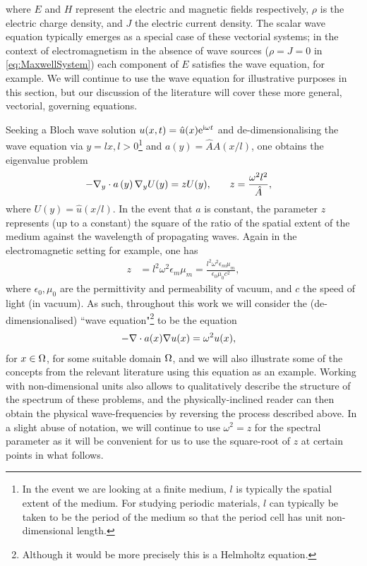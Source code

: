 where $E$ and $H$ represent the electric and magnetic fields respectively, $\rho$ is the electric charge density, and $J$ the electric current density. 
The scalar wave equation typically emerges as a special case of these vectorial systems; in the context of electromagnetism in the absence of wave sources ($\rho=J=0$ in \eqref{eq:MaxwellSystem}) each component of $E$ satisfies the wave equation, for example.
We will continue to use the wave equation for illustrative purposes in this section, but our discussion of the literature will cover these more general, vectorial, governing equations.

Seeking a Bloch wave solution $u(x,t) = \hat{u}(x)\mathrm{e}^{\mathrm{i}\omega t}$ and de-dimensionalising the wave equation via $y=lx, l>0$\footnote{In the event we are looking at a finite medium, $l$ is typically the spatial extent of the medium. For studying periodic materials, $l$ can typically be taken to be the period of the medium so that the period cell has unit non-dimensional length.} and $a(y) = \hat{A}A(x/l)$, one obtains the eigenvalue problem
\begin{align*}
	-\nabla_{y}\cdot a\left( y \right)\nabla_{y} U(y) = z U(y),
	&\qquad 
	z = \frac{\omega^2 l^2}{\hat{A}},
\end{align*}
where $U(y)=\hat{u}(x/l)$.
In the event that $a$ is constant, the parameter $z$ represents (up to a constant) the square of the ratio of the spatial extent of the medium against the wavelength of propagating waves.
Again in the electromagnetic setting for example, one has
\begin{align*}
	z &= l^2 \omega^2 \epsilon_{m}\mu_{m}
	= \frac{l^2 \omega^2 \epsilon_{m}\mu_{m}}{\epsilon_0\mu_0 c^2},
\end{align*}
where $\epsilon_0, \mu_0$ are the permittivity and permeability of vacuum, and $c$ the speed of light (in vacuum).
As such, throughout this work we will consider the (de-dimensionalised) ``wave equation"\footnote{Although it would be more precisely this is a Helmholtz equation.} to be the equation
\begin{align} \label{eq:Intro-GeneralWaveEqn}
	-\nabla\cdot a(x)\nabla u(x) &= \omega^2 u(x), 
\end{align}
for $x\in\Omega$, for some suitable domain $\Omega$, and we will also illustrate some of the concepts from the relevant literature using this equation as an example.
Working with non-dimensional units also allows to qualitatively describe the structure of the spectrum of these problems, and the physically-inclined reader can then obtain the physical wave-frequencies by reversing the process described above.
In a slight abuse of notation, we will continue to use $\omega^2 = z$ for the spectral parameter as it will be convenient for us to use the square-root of $z$ at certain points in what follows.

